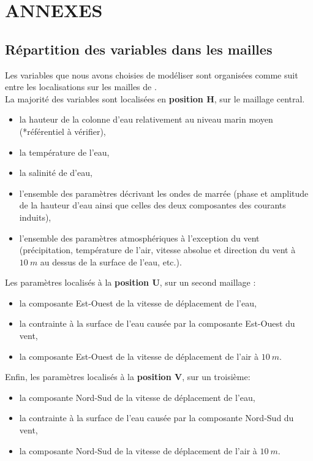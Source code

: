 \documentclass[10pt,a4paper,titlepage]{article}
\begin{document}
\newpage
\section{ANNEXES}
\label{annexes}
\subsection{Répartition des variables dans les mailles}
Les variables que nous avons choisies de modéliser sont organisées comme suit entre les localisations sur les mailles de \cite{Arakawa_C-grid_1977}.\\
La majorité des variables sont localisées en \textbf{position H}, sur le maillage central.
\begin{itemize}
    \item la hauteur de la colonne d'eau relativement au niveau marin moyen (*référentiel à vérifier),
    \item la température de l'eau,
    \item la salinité de d'eau,
    \item l'ensemble des paramètres décrivant les ondes de marrée (phase et amplitude de la hauteur d'eau ainsi que celles des deux composantes des courants induits),
    \item l'ensemble des paramètres atmosphériques à l'exception du vent (précipitation, température de l'air, vitesse absolue et direction du vent à $10~m$ au dessus de la surface de l'eau, etc.).
\end{itemize}
Les paramètres localisés à la \textbf{position U}, sur un second maillage :
\begin{itemize}
    \item la composante Est-Ouest de la vitesse de déplacement de l'eau,
    \item la contrainte à la surface de l'eau causée par la composante Est-Ouest du vent,
    \item la composante Est-Ouest de la vitesse de déplacement de l'air à $10~m$.
\end{itemize}
Enfin, les paramètres localisés à la \textbf{position V}, sur un troisième:
\begin{itemize}
    \item la composante Nord-Sud de la vitesse de déplacement de l'eau,
    \item la contrainte à la surface de l'eau causée par la composante Nord-Sud du vent,
    \item la composante Nord-Sud de la vitesse de déplacement de l'air à $10~m$.
\end{itemize}
\end{document}
